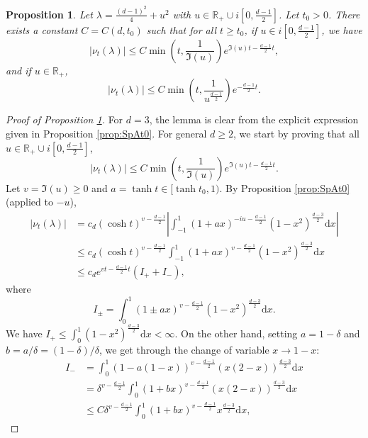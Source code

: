 \documentclass[10pt,a4paper]{amsart}
\newtheorem{proposition}{Proposition}
\newcommand{\R}{\mathds{R}}
\renewcommand{\d}{\mathrm{d}}
\begin{document}
\begin{proposition}{}\label{prop:SpAt}
	Let $\lambda = \frac{(d-1)^2}{4}+u^2$ with $u \in \R_+ \cup i \left[0, \frac{d-1}{2}\right]$. Let $t_0 > 0$. There exists a constant $C = C(d,t_0)$ such that for all $t \geq t_0$, if $u \in i \left[0, \frac{d-1}{2}\right]$, we have
	$$|\nu_t(\lambda)|  \leq C  \min \left( t, \frac{1}{\Im(u)} \right)  e^{ \Im (u)  t-\frac{d-1}{2}t},$$
	and  if $u \in \R_+$,
	$$
	|\nu_t(\lambda)|  \leq C  \min \left( t, \frac{1}{u^{\frac{d-1}{2}}} \right)  e^{-\frac{d-1}{2}t}.
	$$
\end{proposition}

\begin{proof}[Proof of Proposition \ref{prop:SpAt}]
	For $d=3$, the lemma is clear from the explicit expression given in Proposition \ref{prop:SpAt0}. For general $d \geq 2$, we start by proving that all $u \in \R_+ \cup i \left[0, \frac{d-1}{2}\right]$,
	\begin{equation}\label{eq:bdnut1}
		|\nu_t(\lambda)|  \leq C  \min \left( t, \frac{1}{\Im(u)} \right)  e^{ \Im (u)  t-\frac{d-1}{2}t}.
	\end{equation}
	Let $v = \Im(u) \geq 0$ and $a = \tanh t \in [\tanh t_0,1)$. By Proposition \ref{prop:SpAt0} (applied to $-u$), 
	\begin{align*}
		|  \nu_t (\lambda) | &= c_d (\cosh t )^{v - \frac{d-1}{2}} \left| \int_{-1}^{1} ( 1+ a x)^{-iu - \frac{d-1}{2}} ( 1- x^2)^{ \frac{d - 3}{2}} \d x \right| \\
		& \leq c_d (\cosh t )^{v - \frac{d-1}{2}}  \int_{-1}^{1} ( 1+ a x)^{v - \frac{d-1}{2}} ( 1- x^2)^{ \frac{d - 3}{2}}\d x \\
		& \leq c_d e^{v  t-\frac{d-1}{2}t} \left( I_+ + I_-\right),
	\end{align*}
	where 
	$$
	I_{\pm} = \int_{0}^{1} ( 1 \pm a x)^{v - \frac{d-1}{2}} ( 1- x^2)^{ \frac{d - 3}{2}}\d x.
	$$
	We have $I_+ \leq  \int_{0}^{1}   ( 1- x^2)^{ \frac{d - 3}{2}}\d x < \infty$. On the other hand, setting $a =  1- \delta$ and $b = a / \delta = (1 -\delta) / \delta$, we get through the change of variable $x \to 1 -x$:
	\begin{align*}
		I_- & = 	\int_{0}^{1} ( 1 - a (1-x) )^{v - \frac{d-1}{2}} ( x (2 -x) )^{ \frac{d - 3}{2}}\d x	\\
		& =  \delta^{v - \frac{d-1}{2}} \int_{0}^{1} ( 1 + b x )^{v - \frac{d-1}{2}} ( x (2 -x) )^{ \frac{d - 3}{2}}\d x \\
		& \leq C \delta^{v - \frac{d-1}{2}} \int_{0}^{1} ( 1 + b x )^{v - \frac{d-1}{2}}  x  ^{ \frac{d - 3}{2}}\d x, 

\end{align*}
\end{proof}
\end{document}
